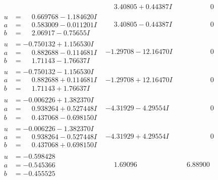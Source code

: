 \documentclass[1p]{elsarticle_modified}
\theoremstyle{definition}
\begin{document}
$$\begin{array}{c|c|c}
 & \phantom{-}3.40805 + 0.44387 I & \phantom{-0.000000 } 0 \\ \hline\begin{aligned}
u &= \phantom{-}0.669768 - 1.184620 I \\
a &= \phantom{-}0.583009 - 0.011201 I \\
b &= \phantom{-}2.06917 - 0.75655 I\end{aligned}
 & \phantom{-}3.40805 - 0.44387 I & \phantom{-0.000000 } 0 \\ \hline\begin{aligned}
u &= -0.750132 + 1.156530 I \\
a &= \phantom{-}0.882688 - 0.114681 I \\
b &= \phantom{-}1.71143 - 1.76637 I\end{aligned}
 & -1.29708 - 12.16470 I & \phantom{-0.000000 } 0 \\ \hline\begin{aligned}
u &= -0.750132 - 1.156530 I \\
a &= \phantom{-}0.882688 + 0.114681 I \\
b &= \phantom{-}1.71143 + 1.76637 I\end{aligned}
 & -1.29708 + 12.16470 I & \phantom{-0.000000 } 0 \\ \hline\begin{aligned}
u &= -0.006226 + 1.382370 I \\
a &= \phantom{-}0.938264 + 0.527448 I \\
b &= \phantom{-}0.437068 - 0.698150 I\end{aligned}
 & -4.31929 - 4.29554 I & \phantom{-0.000000 } 0 \\ \hline\begin{aligned}
u &= -0.006226 - 1.382370 I \\
a &= \phantom{-}0.938264 - 0.527448 I \\
b &= \phantom{-}0.437068 + 0.698150 I\end{aligned}
 & -4.31929 + 4.29554 I & \phantom{-0.000000 } 0 \\ \hline\begin{aligned}
u &= -0.598428\phantom{ +0.000000I} \\
a &= -0.545366\phantom{ +0.000000I} \\
b &= -0.455525\phantom{ +0.000000I}\end{aligned}
 & \phantom{-}1.69096\phantom{ +0.000000I} & \phantom{-}6.88900\phantom{ +0.000000I} \\ \hline\begin{aligned}

\end{aligned}
\end{array}$$
\end{document}

